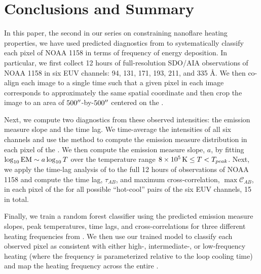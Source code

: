 \section{Conclusions and Summary}\label{sec:conclusions}

In this paper, the second in our series on constraining nanoflare heating properties, we have used predicted diagnostics from  to systematically classify each pixel of \AR{} NOAA 1158 in terms of frequency of energy deposition.
In particular, we first collect 12 hours of full-resolution SDO/AIA observations of NOAA 1158 in six EUV channels: 94, 131, 171, 193, 211, and 335 \AA.
We then co-align each image to a single time such that a given pixel in each image corresponds to approximately the same spatial coordinate and then crop the image to an area of $500\mbox{$^{\prime\prime}$}$-by-$500\mbox{$^{\prime\prime}$}$ centered on the \AR{}.

Next, we compute two diagnostics from these observed intensities: the emission measure slope and the time lag.
We time-average the intensities of all six channels and use the method \citet{hannah_differential_2012} to compute the emission measure distribution in each pixel of the \AR{}.
We then compute the emission measure slope, $a$, by fitting $\log_{10}\textup{EM}\sim a\log_{10}T$ over the temperature range $8\times10^5\,\textup{K}\le T < T_{peak}$. 
Next, we apply the time-lag analysis of \citet{viall_evidence_2012} to the full 12 hours of observations of NOAA 1158 and compute the time lag, $\tau_{AB}$, and maximum cross-correlation, $\max\mathcal{C}_{AB}$, in each pixel of the \AR{} for all possible ``hot-cool'' pairs of the six EUV channels, 15 in total.

Finally, we train a random forest classifier using the predicted emission measure slopes, peak temperatures, time lags, and cross-correlations for three different heating frequencies from .
We then use our trained model to classify each observed pixel as consistent with either high-, intermediate-, or low-frequency heating (where the frequency is parameterized relative to the loop cooling time) and map the heating frequency across the entire \AR{}.

